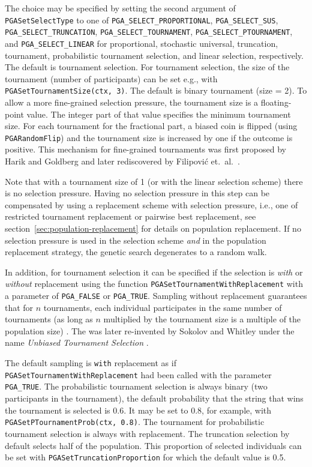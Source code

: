 \documentclass{report}
\begin{document}
\begin{sloppypar}
The choice may be specified by setting the
second argument of {\tt PGASetSelectType} to one of
\verb+PGA_SELECT_PROPORTIONAL+, \verb+PGA_SELECT_SUS+,
\verb+PGA_SELECT_TRUNCATION+, \verb+PGA_SELECT_TOURNAMENT+,
\verb+PGA_SELECT_PTOURNAMENT+, and \verb+PGA_SELECT_LINEAR+
for proportional, stochastic universal, truncation, tournament,
probabilistic tournament selection, and linear selection, respectively.
The default is tournament selection. For tournament
selection, the size of the tournament (number of participants) can be
set e.g., with \verb+PGASetTournamentSize(ctx, 3)+. The default is binary
tournament (size = 2). To allow a more fine-grained selection pressure,
the tournament size is a floating-point value. The integer part of
that value specifies the minimum tournament size. For each tournament
for the fractional part, a biased coin is flipped (using \verb+PGARandomFlip+)
and the tournament size is increased by one if the outcome is positive.
This mechanism for fine-grained tournaments was first proposed by Harik
and Goldberg \cite{HG96} and later rediscovered by Filipovi\'{c}
et.~al.\ \cite{FKTL00}.

Note that with a tournament size of 1 (or with
the linear selection scheme) there is no
selection pressure. Having no selection pressure in this step can be
compensated by using a replacement scheme with selection pressure, i.e.,
one of restricted tournament replacement or pairwise best replacement,
see section~\ref{sec:population-replacement} for details on population
replacement. If no selection pressure is used in the selection scheme
\textit{and} in the population replacement strategy, the genetic search
degenerates to a random walk.
\end{sloppypar}

In addition, for tournament selection it can be
specified if the selection is \textit{with} or \textit{without}
replacement using the function \verb+PGASetTournamentWithReplacement+ with
a parameter of \verb+PGA_FALSE+ or \verb+PGA_TRUE+. Sampling without
replacement guarantees that for $n$ tournaments, each individual
participates in the same number of tournaments (as long as $n$
multiplied by the tournament size is a multiple of the population size)
\cite{GKD89}. The was later re-invented by Sokolov and Whitley under
the name \textit{Unbiased Tournament Selection} \cite{SW05}.

The default sampling is
\texttt{with} replacement as if \verb+PGASetTournamentWithReplacement+
had been called with the parameter \verb+PGA_TRUE+.  The probabilistic
tournament selection is always binary (two participants in the
tournament), the default probability that the string that wins the
tournament is selected is 0.6.  It may be set to 0.8, for example, with {\tt
PGASetPTournamentProb(ctx, 0.8)}. The tournament for probabilistic
tournament selection is always with replacement. The truncation selection
by default selects half of the population. This proportion of selected
individuals can be set with \verb+PGASetTruncationProportion+ for which
the default value is 0.5.
\end{document}
